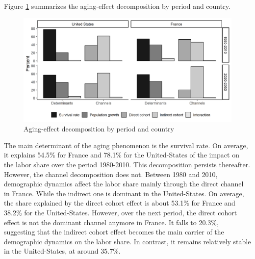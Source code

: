Figure \ref{fig:decomp_country_period} summarizes the aging-effect decomposition by period and country.
\begin{figure}[tb]
	\centering
	\caption{Aging-effect decomposition by period and country} \label{fig:decomp_country_period}
	\includegraphics[width=1\linewidth]{../result/decomposition/decomp_country_period.png}
\end{figure}
The main determinant of the aging phenomenon is the survival rate. On average, it explains 54.5\% for France and 78.1\% for the United-States of the impact on the labor share over the period 1980-2010. This decomposition persists thereafter. However, the channel decomposition does not. Between 1980 and 2010, demographic dynamics affect the labor share mainly through the direct channel in France. While the indirect one is dominant in the United-States. On average, the share explained by the direct cohort effect is about 53.1\% for France and 38.2\% for the United-States. However, over the next period, the direct cohort effect is not the dominant channel anymore in France. It falls to 20.3\%, suggesting that the indirect cohort effect becomes the main carrier of the demographic dynamics on the labor share. In contrast, it remains relatively stable in the United-States, at around 35.7\%.